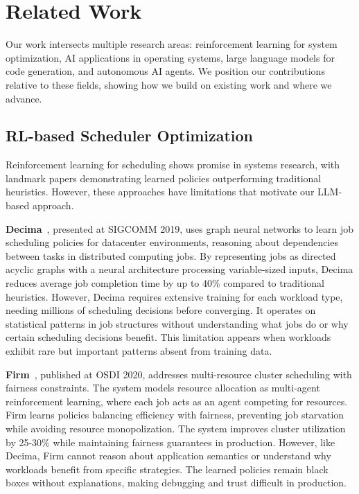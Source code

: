 \section{Related Work}

Our work intersects multiple research areas: reinforcement learning for system optimization, AI applications in operating systems, large language models for code generation, and autonomous AI agents. We position our contributions relative to these fields, showing how we build on existing work and where we advance.

\subsection{RL-based Scheduler Optimization}

Reinforcement learning for scheduling shows promise in systems research, with landmark papers demonstrating learned policies outperforming traditional heuristics. However, these approaches have limitations that motivate our LLM-based approach.

\textbf{Decima}~\cite{mao2019decima}, presented at SIGCOMM 2019, uses graph neural networks to learn job scheduling policies for datacenter environments, reasoning about dependencies between tasks in distributed computing jobs. By representing jobs as directed acyclic graphs with a neural architecture processing variable-sized inputs, Decima reduces average job completion time by up to 40\% compared to traditional heuristics. However, Decima requires extensive training for each workload type, needing millions of scheduling decisions before converging. It operates on statistical patterns in job structures without understanding what jobs do or why certain scheduling decisions benefit. This limitation appears when workloads exhibit rare but important patterns absent from training data.

\textbf{Firm}~\cite{qiu2020firm}, published at OSDI 2020, addresses multi-resource cluster scheduling with fairness constraints. The system models resource allocation as multi-agent reinforcement learning, where each job acts as an agent competing for resources. Firm learns policies balancing efficiency with fairness, preventing job starvation while avoiding resource monopolization. The system improves cluster utilization by 25-30\% while maintaining fairness guarantees in production. However, like Decima, Firm cannot reason about application semantics or understand why workloads benefit from specific strategies. The learned policies remain black boxes without explanations, making debugging and trust difficult in production.

